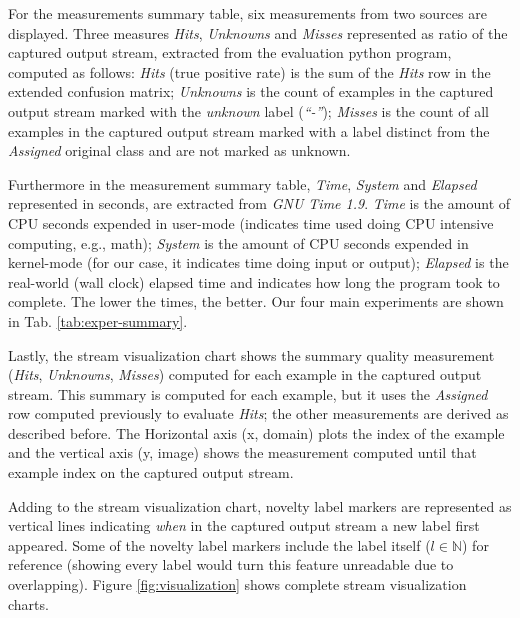 For the measurements summary table, six measurements from two sources are displayed. Three
measures \emph{Hits}, \emph{Unknowns} and \emph{Misses} represented as ratio of
the captured output stream, extracted from the evaluation python program,
computed as follows:
\emph{Hits} (true positive rate) is the sum of the \emph{Hits} row in the
extended confusion matrix;
\emph{Unknowns} is the count of examples in the captured output stream marked
with the \emph{unknown} label (\emph{``-''});
\emph{Misses} is the count of all examples in the captured output stream marked
with a label distinct from the \emph{Assigned} original class and are not marked
as unknown.

Furthermore in the measurement summary table, \emph{Time}, \emph{System} and \emph{Elapsed}
 represented in seconds, are extracted from \emph{GNU Time 1.9}.
\emph{Time} is the amount of CPU seconds expended in user-mode
(indicates time used doing CPU intensive computing, e.g., math);
\emph{System} is the amount of CPU seconds expended in kernel-mode
(for our case, it indicates time doing input or output);
\emph{Elapsed} is the real-world (wall clock) elapsed time and
indicates how long the program took to complete.
The lower the times, the better.
Our four main experiments are shown in Tab. \ref{tab:exper-summary}.

Lastly, the stream visualization chart shows the summary quality measurement
(\emph{Hits}, \emph{Unknowns}, \emph{Misses})
computed for each example in the captured output stream.
This summary is computed for each example, but it uses the \emph{Assigned} row
computed previously to evaluate \emph{Hits}; the other measurements are derived as
described before.
The Horizontal axis (x, domain) plots the index of the example and the
vertical axis (y, image) shows the measurement computed until that example index on the captured
output stream.

Adding to the stream visualization chart, novelty label markers are represented
as vertical lines indicating \emph{when} in the captured output stream a new
label first appeared.
Some of the novelty label markers include the label itself ($l \in \mathbb{N}$)
for reference (showing every label would turn this feature unreadable due
to overlapping).
Figure \ref{fig:visualization} shows complete stream visualization charts.






